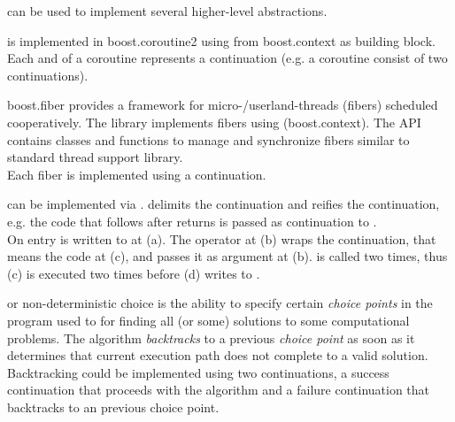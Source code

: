 
\cc can be used to implement several higher-level abstractions.



is implemented in boost.coroutine2\cite{bcoroutine2} using \cc from
boost.context\cite{bcontext} as building block. Each  and
 of a coroutine represents a continuation (e.g. a coroutine
consist of two continuations).



boost.fiber\cite{bfiber} provides a framework for micro-/userland-threads
(fibers) scheduled cooperatively. The library implements fibers using \cc
(boost.context\cite{bcontext}). The API contains classes and functions to manage
and synchronize fibers similar to standard thread support library.\\
Each fiber is implemented using a continuation.



can be implemented via \cc.  delimits the continuation and
 reifies the continuation, e.g. the code that follows after
 returns is passed as continuation to .\\

On entry  is written to  at (a). The  operator
at (b) wraps the continuation, that means the code at (c), and passes it as
argument  at (b).  is called two times, thus (c) is
executed two times before (d) writes  to .



or non-deterministic choice is the ability to specify certain
\emph{choice points} in the program used to for finding all (or some) solutions
to some computational problems. The algorithm \emph{backtracks} to a previous
\emph{choice point} as soon as it determines that current execution path does
not complete to a valid solution.\\
Backtracking could be implemented using two continuations, a success
continuation that proceeds with the algorithm and a failure continuation that
backtracks to an previous choice point\cite{Ferguson}.
